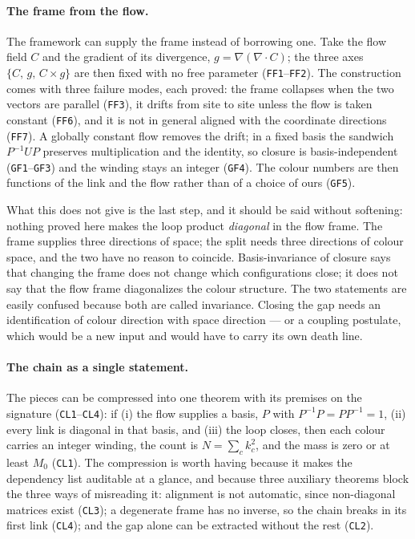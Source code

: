 \documentclass[aps,prd,preprint,superscriptaddress,amsmath,amssymb]{revtex4-2}
\begin{document}
\paragraph{The frame from the flow.}
The framework can supply the frame instead of borrowing one.  Take the flow
field $C$ and the gradient of its divergence, $g=\nabla(\nabla\cdot C)$; the
three axes $\{C,\,g,\,C\times g\}$ are then fixed with no free parameter
(\texttt{FF1}--\texttt{FF2}).  The construction comes with three failure
modes, each proved: the frame collapses when the two vectors are parallel
(\texttt{FF3}), it drifts from site to site unless the flow is taken
constant (\texttt{FF6}), and it is not in general aligned with the
coordinate directions (\texttt{FF7}).  A globally constant flow removes the
drift; in a fixed basis the sandwich $P^{-1}UP$ preserves multiplication
and the identity, so closure is basis-independent (\texttt{GF1}--\texttt{GF3})
and the winding stays an integer (\texttt{GF4}).  The colour numbers are
then functions of the link and the flow rather than of a choice of ours
(\texttt{GF5}).

What this does not give is the last step, and it should be said without
softening: nothing proved here makes the loop product \emph{diagonal} in
the flow frame.  The frame supplies three directions of space; the split
needs three directions of colour space, and the two have no reason to
coincide.  Basis-invariance of closure says that changing the frame does
not change which configurations close; it does not say that the flow frame
diagonalizes the colour structure.  The two statements are easily confused
because both are called invariance.  Closing the gap needs an
identification of colour direction with space direction --- or a coupling
postulate, which would be a new input and would have to carry its own death
line.

\paragraph{The chain as a single statement.}
The pieces can be compressed into one theorem with its premises on the
signature (\texttt{CL1}--\texttt{CL4}): if (i) the flow supplies a basis,
$P$ with $P^{-1}P=PP^{-1}=1$, (ii) every link is diagonal in that basis,
and (iii) the loop closes, then each colour carries an integer winding, the
count is $N=\sum_c k_c^2$, and the mass is zero or at least $M_0$
(\texttt{CL1}).  The compression is worth having because it makes the
dependency list auditable at a glance, and because three auxiliary
theorems block the three ways of misreading it: alignment is not automatic,
since non-diagonal matrices exist (\texttt{CL3}); a degenerate frame has no
inverse, so the chain breaks in its first link (\texttt{CL4}); and the gap
alone can be extracted without the rest (\texttt{CL2}).
\end{document}
